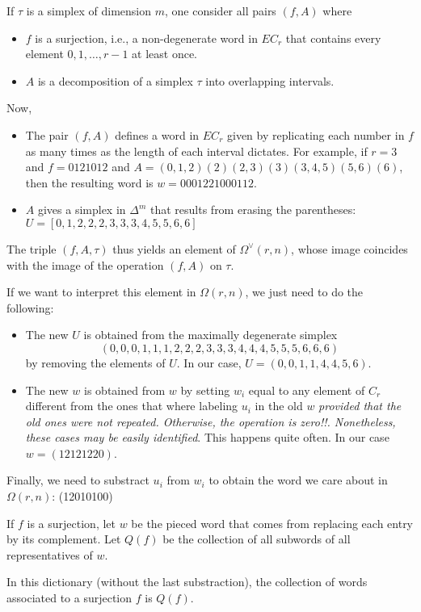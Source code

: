If $\tau$ is a simplex of dimension $m$, one consider all pairs $(f,A)$ where
\begin{itemize}
	\item $f$ is a surjection, i.e., a non-degenerate word in $EC_r$ that contains every element $0,1,\ldots,r-1$ at least once.
	\item $A$ is a decomposition of a simplex $\tau$ into overlapping intervals.
\end{itemize}
Now,
\begin{itemize}
	\item The pair $(f,A)$ defines a word in $EC_r$ given by replicating each number in $f$ as many times as the length of each interval dictates. For example, if $r=3$ and $f= 0121012$ and $A=(0,1,2)(2)(2,3)(3)(3,4,5)(5,6)(6)$, then the resulting word is $w=0001221000112$.
	\item $A$ gives a simplex in $\Delta^m$ that results from erasing the parentheses: $U=[0,1,2,2,2,3,3,3,4,5,5,6,6]$
\end{itemize}
The triple $(f,A,\tau)$ thus yields an element of $\Omega^\vee(r,n)$, whose image coincides with the image of the operation $(f,A)$ on $\tau$.

If we want to interpret this element in $\Omega(r,n)$, we just need to do the following:
\begin{itemize}
	\item The new $U$ is obtained from the maximally degenerate simplex \[(0,0,0,1,1,1,2,2,2,3,3,3,4,4,4,5,5,5,6,6,6)\] by removing the elements of $U$. In our case, $U=(0,0,1,1,4,4,5,6)$.
	\item The new $w$ is obtained from $w$ by setting $w_i$ equal to any element of $C_r$ different from the ones that where labeling $u_i$ in the old $w$ \emph{provided that the old ones were not repeated. Otherwise, the operation is zero!!. Nonetheless, these cases may be easily identified}. This happens quite often. In our case $w=(12121220)$.
\end{itemize}
Finally, we need to substract $u_i$ from $w_i$ to obtain the word we care about in $\Omega(r,n)$: (12010100)

If $f$ is a surjection, let $w$ be the pieced word that comes from replacing each entry by its complement. Let $Q(f)$ be the collection of all subwords of all representatives of $w$.
\begin{lemma} In this dictionary (without the last substraction), the collection of words associated to a surjection $f$ is $Q(f)$.
\end{lemma}

